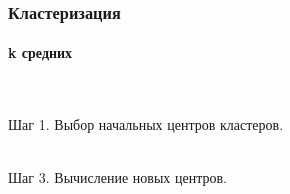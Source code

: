 \documentclass[xcolor=table]{beamer}
\begin{document}
\begin{frame}
  \frametitle{Кластеризация}
  \framesubtitle{k средних}

  \begin{columns}
    \begin{column}{0.5\textwidth}
      \begin{center}
        \\Шаг 1. Выбор начальных центров кластеров.       
        
        \\Шаг 3. Вычисление новых центров.
      \end{center}
    \end{column}
    

\end{columns}
\end{frame}
\end{document}
